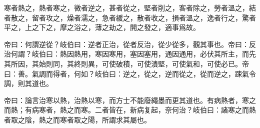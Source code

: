 \documentclass[draft,12pt]{ctexbook}
\begin{document}

\begin{yuanwen}
寒者熱之，熱者寒之，微者逆之，甚者從之，堅者削之，客者除之，勞者溫之，結者散之，留者攻之，燥者濡之，急者緩之，散者收之，損者溫之，逸者行之，驚者平之，上之下之，摩之浴之，薄之劫之，開之發之，適事爲故。

帝曰：何謂逆從？岐伯曰：逆者正治，從者反治，從少從多，觀其事也。帝曰：反治何謂？岐伯曰：熱因熱用，寒因寒用，塞因塞用，通因通用，必伏其所主，而先其所因，其始則同，其終則異，可使破積，可使潰堅，可使氣和，可使必已。帝曰：善。氣調而得者，何如？岐伯曰：逆之，從之，逆而從之，從而逆之，踈氣令調，則其道也。

帝曰：論言治寒以熱，治熱以寒，而方士不能廢繩墨而更其道也。有病熱者，寒之而熱；有病寒者，熱之而寒。二者皆在，新病复起，奈何治？岐伯曰：諸寒之而熱者取之陰，熱之而寒者取之陽，所謂求其屬也。
\end{yuanwen}

\end{document}
